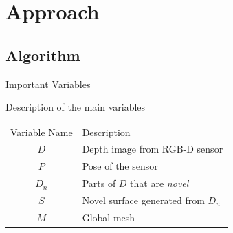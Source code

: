 \section{Approach}

\subsection{Algorithm}

\begin{frame}{Important Variables} %

Description of the main variables

  \begin{table}[h]
    \begin{center}
      \begin{tabular}{c|l}
      \cellcolor{white} Variable Name & Description \\ %
      \rowcolor{LightGray}
      $D$ & Depth image from RGB-D sensor \\
      $P$ & Pose of the sensor \\
      \rowcolor{LightGray}
      $D_n$ & Parts of $D$ that are \emph{novel} \\
      $S$ & Novel surface generated from $D_n$ \\
      \rowcolor{LightGray}
      $M$ & Global mesh \\
      \end{tabular}
    \end{center}
  \end{table}

\end{frame}


